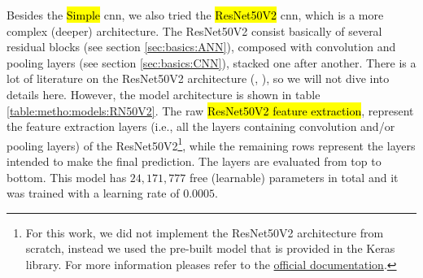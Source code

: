 

\graphicspath{{./Sections/Methodology/Resources/}}


Besides the \hl{Simple} \gls{cnn}, we also tried the \hl{ResNet50V2} \gls{cnn}, which is a more complex (deeper) architecture. The ResNet50V2 consist basically of several residual blocks (see section \ref{sec:basics:ANN}), composed with convolution and pooling layers (see section \ref{sec:basics:CNN}), stacked one after another.
There is a lot of literature on the ResNet50V2 architecture (\cite{he2015deep}, \cite{he2016identity}), so we will not dive into details here. However, the model architecture is shown in table \ref{table:metho:models:RN50V2}.
The raw \hl{ResNet50V2 feature extraction}, represent the feature extraction layers (i.e., all the layers containing convolution and/or pooling layers) of the ResNet50V2\footnote{For this work, we did not implement the ResNet50V2 architecture from scratch, instead we used the pre-built model that is provided in the Keras library. For more information pleases refer to the \href{https://www.tensorflow.org/api_docs/python/tf/keras/applications/ResNet50V2}{official documentation}.}, while the remaining rows represent the layers intended to make the final prediction. The layers are evaluated from top to bottom. This model has $24,171,777$ free (learnable) parameters in total and it was trained with a learning rate of $0.0005$.

\setlength{\mylinewidth}{\linewidth-7pt}%
\setlength{\mylengtha}{0.4\mylinewidth-2\arraycolsep}%
\setlength{\mylengthb}{0.25\mylinewidth-2\arraycolsep}%
\setlength{\mylengthc}{0.18\mylinewidth-2\arraycolsep}%

